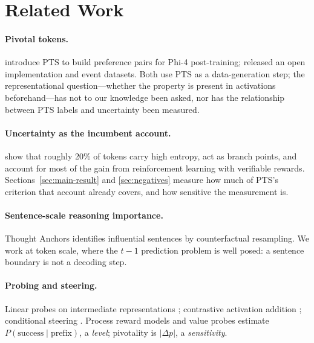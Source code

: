 \documentclass{article}
\newcommand{\pdelta}{\Delta p}
\begin{document}
\section{Related Work}
\label{sec:related}

\paragraph{Pivotal tokens.} \citet{abdin2024phi4technicalreport} introduce
PTS to build preference pairs for Phi-4 post-training; \citet{pts}
released an open implementation and event datasets. Both use PTS as a
data-generation step; the representational question---whether the property
is present in activations beforehand---has not to our knowledge been
asked, nor has the relationship between PTS labels and uncertainty been
measured.

\paragraph{Uncertainty as the incumbent account.}
\citet{wang2025beyond8020} show that roughly 20\% of tokens carry high
entropy, act as branch points, and account for most of the gain from
reinforcement learning with verifiable rewards. Sections~\ref{sec:main-result}
and \ref{sec:negatives} measure how much of PTS's criterion that account
already covers, and how sensitive the measurement is.

\paragraph{Sentence-scale reasoning importance.} Thought Anchors
\citep{bogdan2025thoughtanchors} identifies influential sentences by
counterfactual resampling. We work at token scale, where the $t-1$
prediction problem is well posed: a sentence boundary is not a decoding
step.

\paragraph{Probing and steering.} Linear probes on intermediate
representations \citep{alain2018understandingintermediatelayersusing,
marks2024geometryoftruth}; contrastive activation addition
\citep{rimsky2024caa,huang2024steering}; conditional steering
\citep{lee2024conditionalactivationsteering}. Process reward models and
value probes \citep{li2024qprobe} estimate
$P(\text{success} \mid \text{prefix})$, a \emph{level}; pivotality is
$|\pdelta|$, a \emph{sensitivity}.
\end{document}
